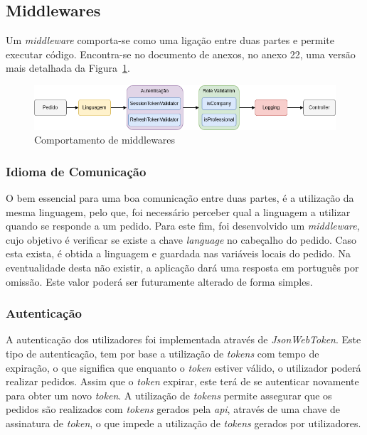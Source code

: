 \subsection{Middlewares} 
Um \textit{middleware} comporta-se como uma ligação entre duas partes e permite executar código. Encontra-se no documento de anexos, no anexo 22, uma versão mais detalhada da Figura~\ref*{middlewares_png}.

\begin{figure}[htb]
 \centering
 \includegraphics[width=\textwidth]{images/implementacao/api/middlewares.png}
 \caption{Comportamento de middlewares}
 \label{middlewares_png}
\end{figure}

\subsubsection{Idioma de Comunicação}\label{sec:idioma_comunicacao}
O bem essencial para uma boa comunicação entre duas partes, é a utilização da mesma linguagem, pelo que, foi necessário perceber qual a linguagem a utilizar quando se responde a um pedido. Para este fim, foi desenvolvido um \textit{middleware}, cujo objetivo é verificar se existe a chave \textit{language} no cabeçalho do pedido. Caso esta exista, é obtida a linguagem e guardada nas variáveis locais do pedido. Na eventualidade desta não existir, a aplicação dará uma resposta em português por omissão. Este valor poderá ser futuramente alterado de forma simples.

\subsubsection{Autenticação}
A autenticação dos utilizadores foi implementada através de \textit{JsonWebToken}. Este tipo de autenticação, tem por base a utilização de \textit{tokens} com tempo de expiração, o que significa que enquanto o \textit{token} estiver válido, o utilizador poderá realizar pedidos. Assim que o \textit{token} expirar, este terá de se autenticar novamente para obter um novo \textit{token}.
A utilização de \textit{tokens} permite assegurar que os pedidos são realizados com \textit{tokens} gerados pela \textit{\acrshort{api}}, através de uma chave de assinatura de \textit{token}, o que impede a utilização de \textit{tokens} gerados por utilizadores.

